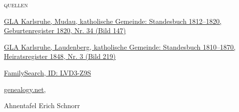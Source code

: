 \begin{person}[
    surname = {Schölch},
    givenname = {Johann Philipp},
    suffix = {1820--1898},
    label = {@I158@}
    ]
\begin{itemize}
\end{itemize}
\medbreak
\textsc{{quellen}}
\begin{enumerate}[label={[\arabic*]}]
\item \href{http://www.landesarchiv-bw.de/plink/?f=4-1119444-147}{GLA Karlsruhe, Mudau, katholische Gemeinde: Standesbuch 1812–1820, Geburtenregister 1820, Nr. 34 (Bild 147)}
\item \href{http://www.landesarchiv-bw.de/plink/?f=4-1119439-219}{GLA Karlsruhe, Laudenberg, katholische Gemeinde: Standesbuch 1810–1870, Heiratsregister 1848, Nr. 3 (Bild 219)}
\item \href{https://www.familysearch.org/tree/person/details/LVD3-Z9S}{FamilySearch, ID: LVD3-Z9S}
\item \href{http://gedbas.genealogy.net/person/show/1172960812}{genealogy.net,  }
\item Ahnentafel Erich Schnorr
\end{enumerate}

\end{person}

